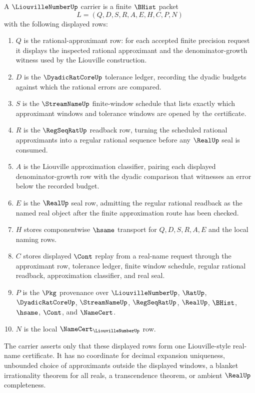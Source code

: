 \begin{definition}
\label{def:liouville-number-carrier}
A $\LiouvilleNumberUp$ carrier is a finite $\BHist$ packet
$$
L=(Q,D,S,R,A,E,H,C,P,N)
$$
with the following displayed rows:
\begin{enumerate}
\item $Q$ is the rational-approximant row: for each accepted finite precision request it displays the inspected rational approximant and the denominator-growth witness used by the Liouville construction.
\item $D$ is the $\DyadicRatCoreUp$ tolerance ledger, recording the dyadic budgets against which the rational errors are compared.
\item $S$ is the $\StreamNameUp$ finite-window schedule that lists exactly which approximant windows and tolerance windows are opened by the certificate.
\item $R$ is the $\RegSeqRatUp$ readback row, turning the scheduled rational approximants into a regular rational sequence before any $\RealUp$ seal is consumed.
\item $A$ is the Liouville approximation classifier, pairing each displayed denominator-growth row with the dyadic comparison that witnesses an error below the recorded budget.
\item $E$ is the $\RealUp$ seal row, admitting the regular rational readback as the named real object after the finite approximation route has been checked.
\item $H$ stores componentwise $\hsame$ transport for $Q,D,S,R,A,E$ and the local naming rows.
\item $C$ stores displayed $\Cont$ replay from a real-name request through the approximant row, tolerance ledger, finite window schedule, regular rational readback, approximation classifier, and real seal.
\item $P$ is the $\Pkg$ provenance over $\LiouvilleNumberUp$, $\RatUp$, $\DyadicRatCoreUp$, $\StreamNameUp$, $\RegSeqRatUp$, $\RealUp$, $\BHist$, $\hsame$, $\Cont$, and $\NameCert$.
\item $N$ is the local $\NameCert_{\LiouvilleNumberUp}$ row.
\end{enumerate}
The carrier asserts only that these displayed rows form one Liouville-style real-name certificate. It has no coordinate for decimal expansion uniqueness, unbounded choice of approximants outside the displayed windows, a blanket irrationality theorem for all reals, a transcendence theorem, or ambient $\RealUp$ completeness.
\end{definition}

